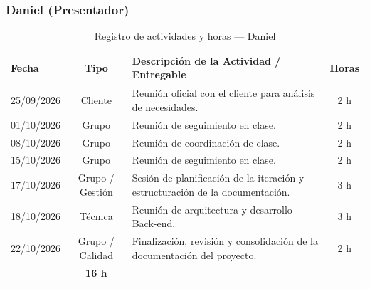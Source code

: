 \subsubsection{Daniel (Presentador)}
\begin{table}[H]
\centering
\small
{}
\begin{tabularx}{\textwidth}{l c X c}
\toprule
\rowcolor{verdeApagado}
\textbf{\color{textoOscuro}Fecha} & \textbf{\color{textoOscuro}Tipo} & \textbf{\color{textoOscuro}Descripción de la Actividad / Entregable} & \textbf{\color{textoOscuro}Horas} \\
\midrule
25/09/2026 & Cliente & Reunión oficial con el cliente para análisis de necesidades. & 2 h \\
01/10/2026 & Grupo & Reunión de seguimiento en clase. & 2 h \\
08/10/2026 & Grupo & Reunión de coordinación de clase. & 2 h \\
15/10/2026 & Grupo & Reunión de seguimiento en clase. & 2 h \\
17/10/2026 & Grupo / Gestión & Sesión de planificación de la iteración y estructuración de la documentación. & 3 h \\
18/10/2026 & Técnica & Reunión de arquitectura y desarrollo Back-end. & 3 h \\
22/10/2026 & Grupo / Calidad & Finalización, revisión y consolidación de la documentación del proyecto. & 2 h \\
\midrule
\rowcolor{azulclaro!60}
\multicolumn{3}{l}{\textbf{\color{textoOscuro}Total Horas Dedicadas — Daniel:}} & \textbf{\color{textoOscuro}16 h} \\
\bottomrule
\end{tabularx}
\caption{Registro de actividades y horas — Daniel}
\end{table}

